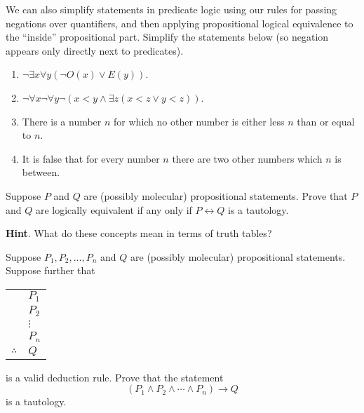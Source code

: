 \documentclass[11pt,]{book}
\theoremstyle{ptxplainnotitle}
\theoremstyle{ptxplaintitle}
\theoremstyle{ptxdefinitionnotitle}
\theoremstyle{ptxdefinitiontitle}
\theoremstyle{ptxdefinitionnotitle}
\theoremstyle{ptxdefinitiontitle}
\theoremstyle{ptxdefinitionnotitle}
\theoremstyle{ptxdefinitiontitle}
\theoremstyle{ptxdefinitiontitlenonumber}
\theoremstyle{ptxdefinitiontitlenonumber}
\numberwithin{equation}{chapter}
\newcommand{\hrulethin}  {\noalign{\hrule height 0.04em}}
\renewcommand{\iff}{\leftrightarrow}
\newcommand{\imp}{\rightarrow}
\newcommand{\lt}{<}
\begin{document}
\begin{divisionexercise}{15}\hypertarget{exercise-185}{}
\hypertarget{p-2496}{}%
We can also simplify statements in predicate logic using our rules for passing negations over quantifiers, and then applying propositional logical equivalence to the ``inside'' propositional part.  Simplify the statements below (so negation appears only directly next to predicates).%
\par
\hypertarget{p-2497}{}%
\leavevmode%
\begin{enumerate}[label=(\alph*)]
\item\hypertarget{li-1273}{}\(\neg \exists x \forall y (\neg O(x) \vee E(y))\).%
\item\hypertarget{li-1274}{}\(\neg \forall x \neg \forall y \neg(x \lt  y \wedge \exists z (x \lt  z \vee y \lt  z))\).%
\item\hypertarget{li-1275}{}\hypertarget{p-2498}{}%
There is a number \(n\) for which no other number is either less \(n\) than or equal to \(n\).%
\item\hypertarget{li-1276}{}\hypertarget{p-2499}{}%
It is false that for every number \(n\) there are two other numbers which \(n\) is between.%
\end{enumerate}
%
\end{divisionexercise}%
\begin{divisionexercise}{16}\hypertarget{exercise-186}{}
\hypertarget{p-2503}{}%
Suppose \(P\) and \(Q\) are (possibly molecular) propositional statements.  Prove that \(P\) and \(Q\) are logically equivalent if any only if \(P \iff Q\) is a tautology.%
\par\smallskip%
\noindent\textbf{Hint}.\hypertarget{hint-15}{}\quad%
\hypertarget{p-2504}{}%
What do these concepts mean in terms of truth tables?%
\end{divisionexercise}%
\begin{divisionexercise}{17}\hypertarget{exercise-187}{}
\hypertarget{p-2505}{}%
Suppose \(P_1, P_2, \ldots, P_n\) and \(Q\) are (possibly molecular) propositional statements.  Suppose further that%
\begin{sidebyside}{1}{0}{0}{0}
\begin{sbspanel}{1}
{\centering%
\begin{tabular}{ll}
&\(P_1\)\tabularnewline[0pt]
&\(P_2\)\tabularnewline[0pt]
&\(\vdots\)\tabularnewline[0pt]
&\(P_n\)\tabularnewline\hrulethin
\(\therefore\)&\(Q\)
\end{tabular}
\par}
\end{sbspanel}
\end{sidebyside}
\par
\hypertarget{p-2506}{}%
is a valid deduction rule.  Prove that the statement%
\begin{equation*}
(P_1 \wedge P_2 \wedge \cdots \wedge P_n) \imp Q
\end{equation*}
is a tautology.%
\end{divisionexercise}%
\typeout{************************************************}
\typeout{************************************************}
\end{document}
